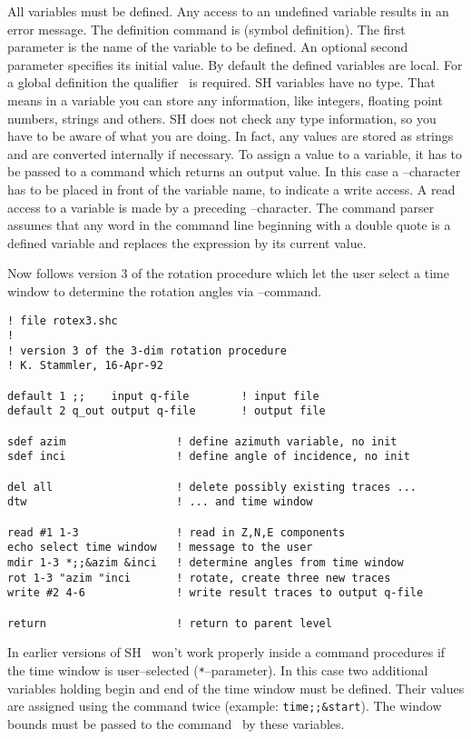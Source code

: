 All variables must be defined.  Any access to an undefined variable
results in an error message.  The definition command is 
(symbol definition).  The first parameter is the name of the
variable to be defined.  An optional second parameter specifies
its initial value.  By default the defined variables are local.
For a global definition the qualifier \ is required.
SH variables have no type.  That means in a variable you can store
any information, like integers, floating point numbers, strings and
others.  SH does not check any type information, so you have to be
aware of what you are doing.  In fact, any values are stored as
strings and are converted internally if necessary.  To assign
a value to a variable, it has to be passed to a command which
returns an output value.  In this case a \cmd{\&}--character has
to be placed in front of the variable name, to indicate a write
access.  A read access to a variable is made by a preceding
--character.  The command parser assumes that any word
in the command line beginning with a double quote is a defined
variable and replaces the expression by its current value.

Now follows version 3 of the rotation procedure
which let the user select a time window to determine the rotation
angles via --command.

\begin{verbatim}
! file rotex3.shc
!
! version 3 of the 3-dim rotation procedure
! K. Stammler, 16-Apr-92

default 1 ;;    input q-file        ! input file
default 2 q_out output q-file       ! output file

sdef azim                 ! define azimuth variable, no init
sdef inci                 ! define angle of incidence, no init

del all                   ! delete possibly existing traces ...
dtw                       ! ... and time window

read #1 1-3               ! read in Z,N,E components
echo select time window   ! message to the user
mdir 1-3 *;;&azim &inci   ! determine angles from time window
rot 1-3 "azim "inci       ! rotate, create three new traces
write #2 4-6              ! write result traces to output q-file

return                    ! return to parent level
\end{verbatim}

In earlier versions of SH \ won't work properly inside
a command procedures if the time window is user--selected
(\verb+*+--parameter).  In this case two additional variables
holding begin and end of the time window must be defined.  Their
values are assigned using the command  twice (example:
\verb+time;;&start+).  The window bounds must be passed to the
command \ by these variables.


